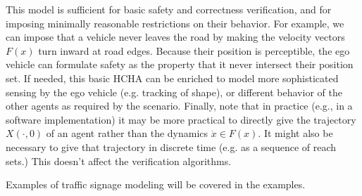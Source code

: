 This model is sufficient for basic safety and correctness verification, and for imposing minimally reasonable restrictions on their behavior. 
For example, we can impose that a vehicle never leaves the road by making the velocity vectors $F(x)$ turn inward at road edges.
Because their position is perceptible, the ego vehicle can formulate safety as the property that it never intersect their position set.
If needed, this basic HCHA can be enriched to model more sophisticated sensing by the ego vehicle (e.g. tracking of shape), or different behavior of the other agents as required by the scenario.
Finally, note that in practice (e.g., in a software implementation) it may be more practical to directly give the trajectory $X(\cdot,0)$ of an agent rather than the dynamics $\dot{x} \in F(x)$. 
It might also be necessary to give that trajectory in discrete time (e.g. as a sequence of reach sets.)
This doesn't affect the verification algorithms.

Examples of traffic signage modeling will be covered in the examples.
